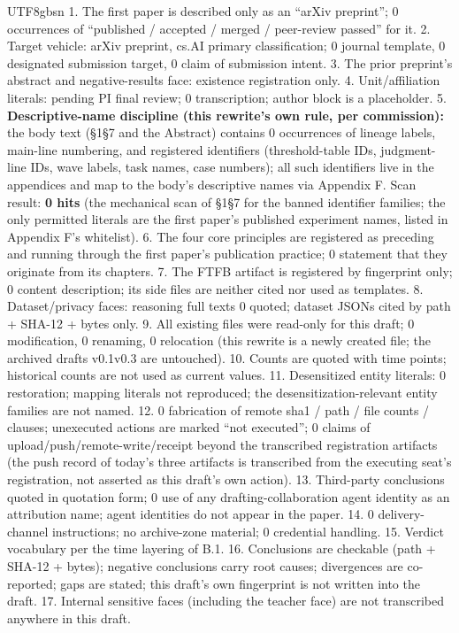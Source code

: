 \documentclass[11pt,letterpaper]{article}
\begin{document}
\begin{CJK}{UTF8}{gbsn}
1. The first paper is described only as an ``arXiv preprint''; 0 occurrences of ``published / accepted / merged / peer-review passed'' for it. 2. Target vehicle: arXiv preprint, cs.AI primary classification; 0 journal template, 0 designated submission target, 0 claim of submission intent. 3. The prior preprint's abstract and negative-results face: existence registration only. 4. Unit/affiliation literals: pending PI final review; 0 transcription; author block is a placeholder. 5. \textbf{Descriptive-name discipline (this rewrite's own rule, per commission):} the body text (\S{}1\textendash{}\S{}7 and the Abstract) contains 0 occurrences of lineage labels, main-line numbering, and registered identifiers (threshold-table IDs, judgment-line IDs, wave labels, task names, case numbers); all such identifiers live in the appendices and map to the body's descriptive names via Appendix F. Scan result: \textbf{0 hits} (the mechanical scan of \S{}1\textendash{}\S{}7 for the banned identifier families; the only permitted literals are the first paper's published experiment names, listed in Appendix F's whitelist). 6. The four core principles are registered as preceding and running through the first paper's publication practice; 0 statement that they originate from its chapters. 7. The FTFB artifact is registered by fingerprint only; 0 content description; its side files are neither cited nor used as templates. 8. Dataset/privacy faces: reasoning full texts 0 quoted; dataset JSONs cited by path + SHA-12 + bytes only. 9. All existing files were read-only for this draft; 0 modification, 0 renaming, 0 relocation (this rewrite is a newly created file; the archived drafts v0.1\textendash{}v0.3 are untouched). 10. Counts are quoted with time points; historical counts are not used as current values. 11. Desensitized entity literals: 0 restoration; mapping literals not reproduced; the desensitization-relevant entity families are not named. 12. 0 fabrication of remote sha1 / path / file counts / clauses; unexecuted actions are marked ``not executed''; 0 claims of upload/push/remote-write/receipt beyond the transcribed registration artifacts (the push record of today's three artifacts is transcribed from the executing seat's registration, not asserted as this draft's own action). 13. Third-party conclusions quoted in quotation form; 0 use of any drafting-collaboration agent identity as an attribution name; agent identities do not appear in the paper. 14. 0 delivery-channel instructions; no archive-zone material; 0 credential handling. 15. Verdict vocabulary per the time layering of B.1. 16. Conclusions are checkable (path + SHA-12 + bytes); negative conclusions carry root causes; divergences are co-reported; gaps are stated; this draft's own fingerprint is not written into the draft. 17. Internal sensitive faces (including the teacher face) are not transcribed anywhere in this draft.


\end{CJK}
\end{document}
